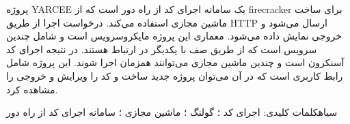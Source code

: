 \begin{ParsaAbstractParsi}
    پروژه YARCEE یک سامانه اجرای کد از راه دور است که از firecracker برای ساخت ماشین مجازی استفاده می‌کند.
    درخواست اجرا از طریق HTTP ارسال می‌شود و خروجی نمایش داده می‌شود.
    معماری این پروژه مایکروسرویس است و شامل چندین سرویس است که از طریق صف با یکدیگر در ارتباط هستند.
    در نتیجه اجرای کد آسنکرون است و چندین ماشین مجازی می‌توانند همزمان اجرا شوند.
    این پروژه شامل رابط کاربری است که در آن می‌توان پروژه جدید ساخت و کد را ویرایش و خروجی را مشاهده کرد.

    \bigskip\noindent
    ‌سیاه{کلمات کلیدی:} اجرای کد ؛ گولنگ ؛ ماشین مجازی ؛ سامانه اجرای کد از راه دور
\end{ParsaAbstractParsi}
\clearpage